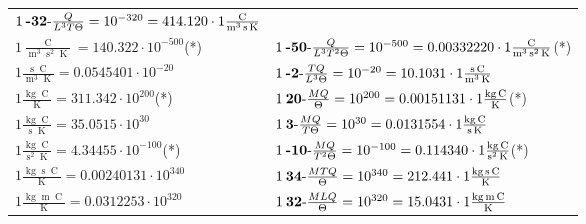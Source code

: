 \begin{center}
\begin{longtable}{l l}
	{\color{black}$1\:\text{\textbf{-32}-} \frac{Q}{L^3T\Theta}=10^{-320} = 414.120 \cdot 1 \bm{\mathrm{ }}\frac{\operatorname{C}}{\operatorname{m}^3\operatorname{s}\operatorname{K}}$}\\
{\color{black}$1 \bm{\mathrm{ }}\frac{\operatorname{C}}{\operatorname{m}^3\operatorname{s}^2\operatorname{K}} = 140.322\cdot10^{-500} $}\quad(*)&
	{\color{black}$1\:\text{\textbf{-50}-} \frac{Q}{L^3T^2\Theta}=10^{-500} = 0.00332220 \cdot 1 \bm{\mathrm{ }}\frac{\operatorname{C}}{\operatorname{m}^3\operatorname{s}^2\operatorname{K}}$}\quad(*)\\
{\color{black}$1 \bm{\mathrm{ }}\frac{\operatorname{s}\operatorname{C}}{\operatorname{m}^3\operatorname{K}} = 0.0545401\cdot10^{-20} $}&
	{\color{black}$1\:\text{\textbf{-2}-} \frac{TQ}{L^3\Theta}=10^{-20} = 10.1031 \cdot 1 \bm{\mathrm{ }}\frac{\operatorname{s}\operatorname{C}}{\operatorname{m}^3\operatorname{K}}$}\\
\hline{\color{black}$1 \bm{\mathrm{ }}\frac{\operatorname{kg}\operatorname{C}}{\operatorname{K}} = 311.342\cdot10^{200} $}\quad(*)&
	{\color{black}$1\:\text{\textbf{20}-} \frac{MQ}{\Theta}=10^{200} = 0.00151131 \cdot 1 \bm{\mathrm{ }}\frac{\operatorname{kg}\operatorname{C}}{\operatorname{K}}$}\quad(*)\\
{\color{black}$1 \bm{\mathrm{ }}\frac{\operatorname{kg}\operatorname{C}}{\operatorname{s}\operatorname{K}} = 35.0515\cdot10^{30} $}&
	{\color{black}$1\:\text{\textbf{3}-} \frac{MQ}{T\Theta}=10^{30} = 0.0131554 \cdot 1 \bm{\mathrm{ }}\frac{\operatorname{kg}\operatorname{C}}{\operatorname{s}\operatorname{K}}$}\\
{\color{black}$1 \bm{\mathrm{ }}\frac{\operatorname{kg}\operatorname{C}}{\operatorname{s}^2\operatorname{K}} = 4.34455\cdot10^{-100} $}\quad(*)&
	{\color{black}$1\:\text{\textbf{-10}-} \frac{MQ}{T^2\Theta}=10^{-100} = 0.114340 \cdot 1 \bm{\mathrm{ }}\frac{\operatorname{kg}\operatorname{C}}{\operatorname{s}^2\operatorname{K}}$}\quad(*)\\
{\color{black}$1 \bm{\mathrm{ }}\frac{\operatorname{kg}\operatorname{s}\operatorname{C}}{\operatorname{K}} = 0.00240131\cdot10^{340} $}&
	{\color{black}$1\:\text{\textbf{34}-} \frac{MTQ}{\Theta}=10^{340} = 212.441 \cdot 1 \bm{\mathrm{ }}\frac{\operatorname{kg}\operatorname{s}\operatorname{C}}{\operatorname{K}}$}\\
{\color{black}$1 \bm{\mathrm{ }}\frac{\operatorname{kg}\operatorname{m}\operatorname{C}}{\operatorname{K}} = 0.0312253\cdot10^{320} $}&
	{\color{black}$1\:\text{\textbf{32}-} \frac{MLQ}{\Theta}=10^{320} = 15.0431 \cdot 1 \bm{\mathrm{ }}\frac{\operatorname{kg}\operatorname{m}\operatorname{C}}{\operatorname{K}}$}\\

\end{longtable}
\end{center}
